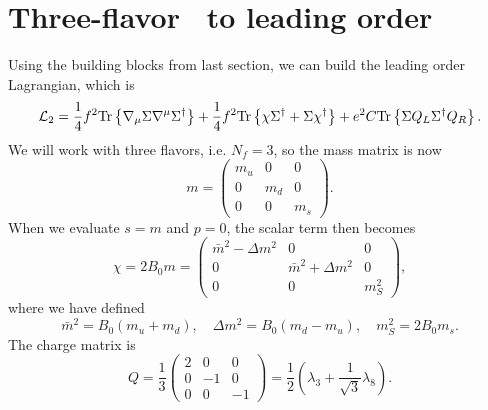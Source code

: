 \section{Three-flavor \chpt\ to leading order}
\label{section: three-flavor chpt to leading order}


Using the building blocks from last section, we can build the leading order Lagrangian, which is~\autocite{eckerRoleResonancesChiral1989,gasserChiralPerturbationTheory1984,gasserChiralPerturbationTheory1985,schererIntroductionChiralPerturbation2002}
%
\begin{equation}
    \label{leading order three-flavor Lagrangian}
    \mathcal{L}_2 
    = \frac{1}{4}f^2 \text{Tr} \left\{ \nabla_\mu \Sigma \nabla^\mu \Sigma^\dagger \right\}
    + \frac{1}{4}f^2 \text{Tr} \left\{ \chi \Sigma^\dagger + \Sigma \chi^\dagger \right\}
    + e^2 C \text{Tr} \left\{ \Sigma Q_L \Sigma^\dagger Q_R \right\}.
\end{equation}
%
We will work with three flavors, i.e. $N_f = 3$, so the mass matrix is now
%
\begin{equation}
    m = 
    \begin{pmatrix}
        m_u & 0 & 0 \\
        0 & m_d & 0 \\
        0 & 0 & m_s
    \end{pmatrix}.
\end{equation}
%
When we evaluate $s = m$ and $p = 0$, the scalar term then becomes
%
\begin{equation}
    \chi = 2B_0 m = 
    \begin{pmatrix}
        \bar m^2 - \Delta m^2 & 0 &0\\
        0& \bar m^2 + \Delta m^2 & 0 \\
        0&0&m_S^2
    \end{pmatrix},
\end{equation}
%
where we have defined
%
\begin{equation}
    \bar m^2 =  B_0(m_u + m_d),\quad 
    \Delta m^2 = B_0(m_d - m_u), \quad
    m_S^2 = 2B_0 m_s.
\end{equation}
%
The charge matrix is
%
\begin{equation}
    \label{three-flavor charge matrix}
    Q = \frac{1}{3}
    \begin{pmatrix}
        2 & 0 & 0\\
        0 & -1 & 0\\
        0 & 0 & -1
    \end{pmatrix}
    = \frac{1}{2} \left( \lambda_3 + \frac{1}{\sqrt{3}} \lambda_8 \right).
\end{equation}
